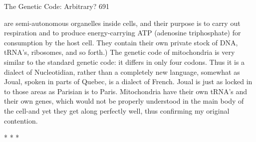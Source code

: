 The Genetic Code: Arbitrary?                                                        691

are semi-autonomous organelles inside cells, and their purpose is to carry out
respiration and to produce energy-carrying ATP (adenosine triphosphate) for
consumption by the host cell. They contain their own private stock of DNA, tRNA's,
ribosomes, and so forth.) The genetic code of mitochondria is very similar to the
standard genetic code: it differs in only four codons. Thus it is a dialect of
Nucleotidian, rather than a completely new language, somewhat as Joual, spoken in
parts of Quebec, is a dialect of French. Joual is just as locked in to those areas as
Parisian is to Paris. Mitochondria have their own tRNA's and their own genes, which
would not be properly understood in the main body of the cell-and yet they get along
perfectly well, thus confirming my original contention.

                                        *   *   *

